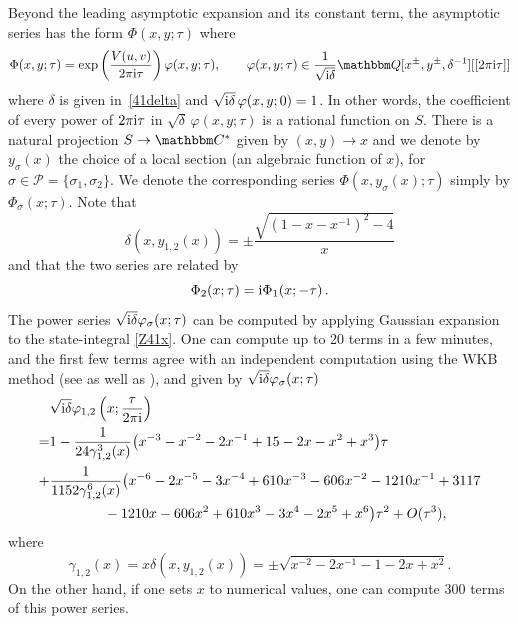 \documentclass[12pt,reqno]{amsart}
\theoremstyle{definition}
\def\BQ{\mathbbm Q}
\def\BC{\mathbbm C}
\def\calP{\mathcal P}
\def\s{\sigma}
\def\ri{\mathrm{i}}
\def\ri{{\rm i}}
\def\cO{O}
\newcommand{\nn}{\nonumber \\}
\begin{document}
Beyond the leading asymptotic expansion and its constant term, the
asymptotic series has the form $\Phi(x,y;\tau)$ where 
\begin{equation}
  \label{Phi41}
  \Phi(x,y;\tau)=\exp\left( { V(u,v) \over 2\pi\ri \tau} \right)
  \varphi(x,y;\tau),
  \qquad 
  \varphi(x,y;\tau) \in \frac{1}{\sqrt{\ri\delta}}
  \BQ[x^\pm,y^\pm,\delta^{-1}] [[2 \pi \ri \tau]]
\end{equation}
where $\delta$ is given in~\eqref{41delta} and
$\sqrt{\ri \delta} \, \varphi(x,y;0)=1$.  In other words, the
coefficient of every power of $2\pi \ri \tau$ in
$\sqrt{\delta} \, \varphi(x,y;\tau)$ is a rational function on
$S$. There is a natural projection $S \to \BC^*$ given by
$(x,y) \rightarrow x$ and we denote by $y_\s(x)$ the choice of a local
section (an algebraic function of $x$), for
$\s \in \calP=\{\s_1,\s_2\}$.  We denote the corresponding series
$\Phi(x,y_\s(x);\tau)$ simply by $\Phi_\s(x;\tau)$.
Note that
\begin{equation}
  \delta(x,y_{1,2}(x)) = \pm\frac{\sqrt{(1-x-x^{-1})^2-4}}{x}
  \label{eq:delta-41}
\end{equation}
and that the two series are related by
\begin{equation}
\label{Phi4112}
\Phi_2(x;\tau) = \ri \Phi_1(x;-\tau) \,.
\end{equation}
The power series $\sqrt{\ri\delta}\varphi_\s(x;\tau)$ can be computed
by applying Gaussian expansion to the state-integral \eqref{Z41x}. One
can compute up to 20 terms in a few minutes, and
the first few terms agree with an independent computation using the
WKB method (see \cite[Eqn.(4.39)]{DGLZ} as well as
\cite{GG:asymptotics}), and given by $\sqrt{\ri\delta}\varphi_\s(x;\tau)$
\begin{align}
  &\sqrt{\ri\delta}\varphi_{1,2}\left(x;\frac{\tau}{2\pi\ri}\right)\nn =
  &1 - \frac{1}{24\gamma_{1,2}^3(x)}\big(x^{-3} - x^{-2} - 2 x^{-1} + 15 -
    2 x - x^2 + x^3\big) \tau\nn+
  &\frac{1}{1152\gamma_{1,2}^6(x)}
    \big(x^{-6} - 2 x^{-5} - 3 x^{-4} + 610 x^{-3} - 
    606 x^{-2} - 1210 x^{-1} + 3117\nn
  &\phantom{=====}- 1210 x - 606 x^2 + 610 x^3 - 
    3 x^4 - 2 x^5 + x^6\big) \tau^2 +\cO(\tau^3),
    \label{eq:vf-41}
\end{align}
where
\begin{equation}
  \gamma_{1,2}(x) = x\delta(x,y_{1,2}(x)) = \pm\sqrt{x^{-2}-2x^{-1}-1-2x+x^2}.
\end{equation}
On the other hand, if one sets $x$ to numerical values, one can
compute 300 terms of this power series.
\end{document}
